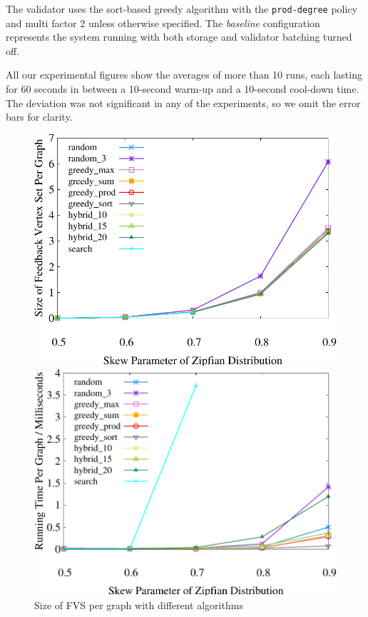 The validator uses the sort-based greedy algorithm with the \texttt{prod-degree} policy and multi factor 2 unless otherwise specified. The \emph{baseline} configuration represents the system running with both storage and validator batching turned off. 

All our experimental figures show the averages of more than 10 runs, each lasting for 60 seconds in between a 10-second warm-up and a 10-second cool-down time. The deviation was not significant in any of the experiments, so we omit the error bars for clarity.

\begin{figure}[t]
    \centering
    \begin{minipage}[b]{0.32\linewidth}
        \centering
        \includegraphics[width=\textwidth]{./exp_fig/fvs/fvs}
        \vspace{-2em}
        \caption{Size of FVS per graph with different algorithms}
        \label{fig:fvs:fvs}
    \end{minipage}
    \begin{minipage}[b]{0.32\linewidth}
        \centering
        \includegraphics[width=\textwidth]{./exp_fig/fvs/latency}

\end{minipage}
\end{figure}

